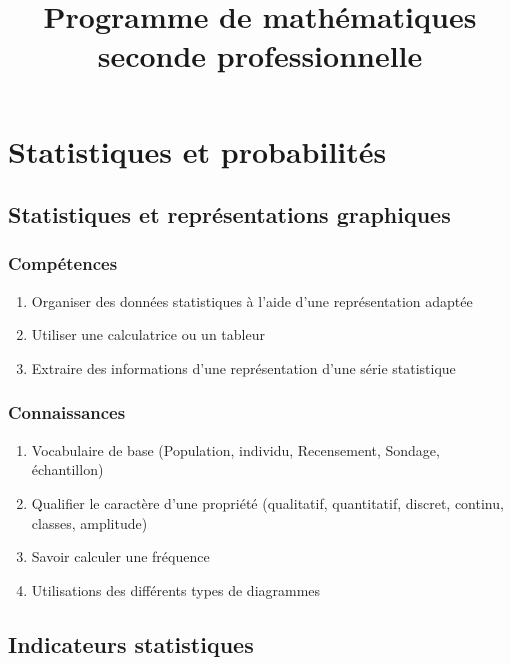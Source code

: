 \documentclass[12pt,a4paper]{article}
\author{}
\date{}
\title{Programme de mathématiques seconde professionnelle}
\begin{document}
\maketitle

\section{Statistiques et probabilités}

\subsection{Statistiques et représentations graphiques }\label{ch:2:stats_base}

	

\subsubsection*{Compétences}

\begin{enumerate}
	\item Organiser des données statistiques à l'aide d'une représentation adaptée
	\item Utiliser une calculatrice ou un tableur
	\item Extraire des informations d'une représentation d'une série statistique
\end{enumerate}

\subsubsection*{Connaissances}

\begin{enumerate}
	\item Vocabulaire de base (Population, individu, Recensement, Sondage, échantillon) 
	\item Qualifier le caractère d'une propriété (qualitatif, quantitatif, discret, continu, classes, amplitude)
	\item Savoir calculer une fréquence
	\item Utilisations des différents types de diagrammes	
\end{enumerate}

\subsection{Indicateurs statistiques}\label{ch:2:indicateurs}
\end{document}
